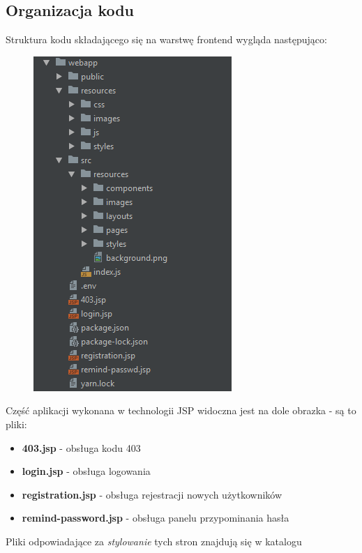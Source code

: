 \documentclass[11pt]{article}
\begin{document}
\subsection{Organizacja kodu}
Struktura kodu składającego się na warstwę frontend wygląda następująco:
\begin{figure}[H]
\centering
\includegraphics[scale=0.7]{res/front_struktura}
\end{figure}
Część aplikacji wykonana w technologii JSP widoczna jest na dole obrazka - są to pliki:
\begin{itemize}
\item \textbf{403.jsp} - obsługa kodu 403
\item \textbf{login.jsp} - obsługa logowania
\item \textbf{registration.jsp} - obsługa rejestracji nowych użytkowników
\item \textbf{remind-password.jsp} - obsługa panelu przypominania hasła
\end{itemize}
Pliki odpowiadające za \emph{stylowanie} tych stron znajdują się w katalogu 
\end{document}
